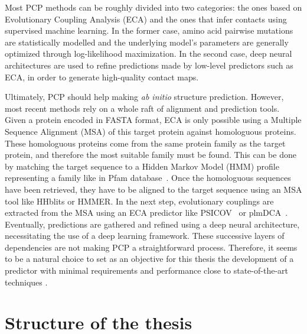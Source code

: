     Most PCP methods can be roughly divided into two categories:
    the ones based on Evolutionary Coupling Analysis (ECA) and the ones that infer contacts using
    supervised machine learning. In the former case, amino acid pairwise mutations are statistically modelled and the underlying model's parameters
    are generally optimized through log-likelihood maximization. In the second case, deep neural architectures are used to
    refine predictions made by low-level predictors such as ECA, in order to generate high-quality contact maps.

    Ultimately, PCP should help making \textit{ab initio} structure prediction.
    However, most recent methods rely on a whole raft of alignment and prediction tools.
    Given a protein encoded in FASTA format, ECA is only possible using a Multiple Sequence Alignment (MSA)
    of this target protein against homologuous proteins. These homologuous proteins come from the same protein family
    as the target protein, and therefore the most suitable family must be found.
    This can be done by matching the target sequence to a Hidden Markov Model (HMM) profile representing a family
    like in Pfam database~\cite{Pfam}. Once the homologuous sequences have been retrieved, they have to be aligned to
    the target sequence using an MSA tool like HHblits or HMMER. In the next step, evolutionary couplings are extracted from
    the MSA using an ECA predictor like PSICOV~\cite{doi:10.1093/bioinformatics/btr638} or plmDCA~\cite{EKEBERG2014341}.
    Eventually, predictions are gathered and refined using a deep neural architecture, necessitating the use
    of a deep learning framework. These successive layers of dependencies are not making PCP a straightforward process.
    Therefore, it seems to be a natural choice to set as an objective for this thesis the development of a predictor with
    minimal requirements and performance close to state-of-the-art techniques
    \cite{RaptorX, DeepContact, doi:10.1093/bioinformatics/bty341, doi:10.1093/bioinformatics/bty341, Michel383133, DeepMind}.

\section{Structure of the thesis}

